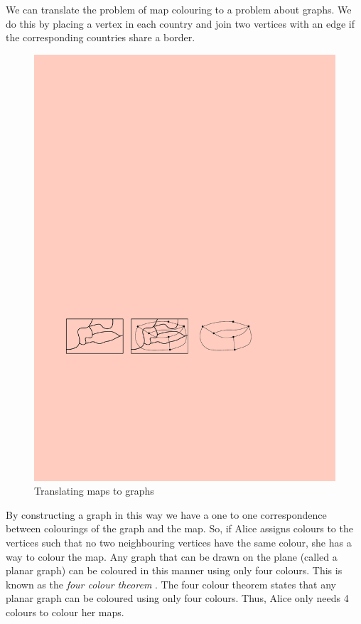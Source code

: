 We can translate the problem of map colouring to a problem about graphs. We do this by placing a vertex in each country and join two vertices with an edge if the corresponding countries share a border. 
\begin{figure}[h]
    \centering
    \includegraphics[width=\textwidth]{images/161-fig38}
    \caption{Translating maps to graphs}
\end{figure}
By constructing a graph in this way we have a one to one correspondence between colourings of the graph and the map. So, if Alice assigns colours to the vertices such that no two neighbouring vertices have the same colour, she has a way to colour the map. Any graph that can be drawn on the plane (called a planar graph) can be coloured in this manner using only four colours. This is known as the \textit{four colour theorem} \cite{thomas19984ColourUpdate}. The four colour theorem states that any planar graph can be coloured using only four colours. Thus, Alice only needs 4 colours to colour her maps.

